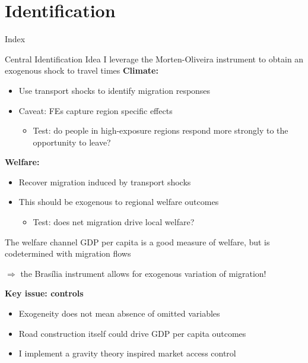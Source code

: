 \documentclass[aspectratio=169]{beamer}
\begin{document}
\section{Identification}
\begin{frame}{Index}
\tableofcontents[currentsection]
\end{frame}

\begin{frame}{Central Identification Idea}
I leverage the Morten-Oliveira instrument to obtain an exogenous shock to travel times
\textbf{Climate:}
\begin{itemize}
    \item Use transport shocks to identify migration responses
    \item Caveat: FEs capture region specific effects
    \begin{itemize}
        \item Test: do people in high-exposure regions respond more strongly to the opportunity to leave?
    \end{itemize}
\end{itemize}
\textbf{Welfare:}
\begin{itemize}
    \item Recover migration induced by transport shocks
    \item This should be exogenous to regional welfare outcomes
    \begin{itemize}
        \item Test: does net migration drive local welfare?
    \end{itemize}
\end{itemize}
\end{frame}


\begin{frame}{The welfare channel}
GDP per capita is a good measure of welfare, but is codetermined with migration flows \par 
$\Rightarrow$  the Brasília instrument allows for exogenous variation of migration!

\vspace{0.5em}
\textbf{Key issue: controls}
\begin{itemize}
    \item Exogeneity does not mean absence of omitted variables
    \item Road construction itself could drive GDP per capita outcomes
    \item I implement a gravity theory inspired market access control
\end{itemize}
\end{frame}
\end{document}
